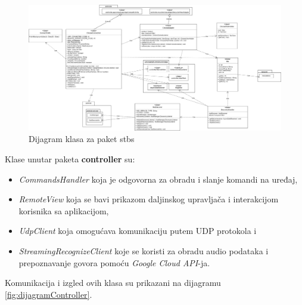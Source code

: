 \documentclass[implementacija.tex]{subfiles}
\begin{document}
\begin{figure}[!ht]
  \centering
  \includegraphics[width=\textwidth]{Implementacija/dijagrami/stbs_pakage_class_diagram.jpg}
  \caption{Dijagram klasa za paket stbs}
  \label{fig:dijagramStbs}
\end{figure}

Klase unutar paketa \textbf{controller} su:
\begin{itemize}
\item \textit{CommandsHandler} koja je odgovorna za obradu i slanje komandi na uređaj,
\item \textit{RemoteView} koja se bavi prikazom daljinskog upravljača i interakcijom korisnika sa aplikacijom,
\item \textit{UdpClient} koja omogućava komunikaciju putem UDP protokola i
\item \textit{StreamingRecognizeClient} koje se koristi za obradu audio podataka i prepoznavanje govora pomoću \textit{Google Cloud API}-ja. 
\end{itemize}
Komunikacija i izgled ovih klasa su prikazani na dijagramu \ref{fig:dijagramController}.
\end{document}

